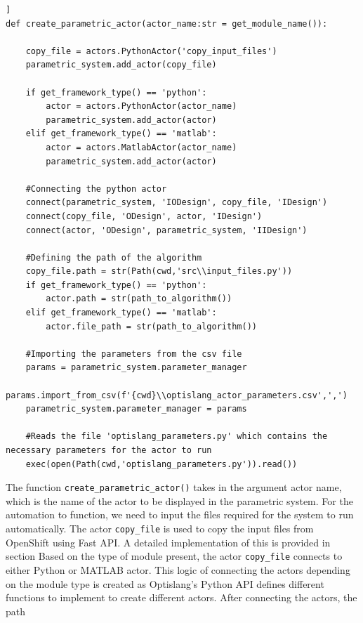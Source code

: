 \renewcommand{\lstlistingname}{Code}
\begin{lstlisting}[style=pythoncode, caption= Function to create a parametric system, label={create_parametric_system}] ]
def create_parametric_actor(actor_name:str = get_module_name()):

    copy_file = actors.PythonActor('copy_input_files')
    parametric_system.add_actor(copy_file)

    if get_framework_type() == 'python':
        actor = actors.PythonActor(actor_name)
        parametric_system.add_actor(actor)
    elif get_framework_type() == 'matlab':
        actor = actors.MatlabActor(actor_name)
        parametric_system.add_actor(actor)

    #Connecting the python actor
    connect(parametric_system, 'IODesign', copy_file, 'IDesign')
    connect(copy_file, 'ODesign', actor, 'IDesign')
    connect(actor, 'ODesign', parametric_system, 'IIDesign')

    #Defining the path of the algorithm
    copy_file.path = str(Path(cwd,'src\\input_files.py'))
    if get_framework_type() == 'python':
        actor.path = str(path_to_algorithm())
    elif get_framework_type() == 'matlab':
        actor.file_path = str(path_to_algorithm())

    #Importing the parameters from the csv file
    params = parametric_system.parameter_manager
    params.import_from_csv(f'{cwd}\\optislang_actor_parameters.csv',',')
    parametric_system.parameter_manager = params

    #Reads the file 'optislang_parameters.py' which contains the necessary parameters for the actor to run
    exec(open(Path(cwd,'optislang_parameters.py')).read())
\end{lstlisting}
The function \texttt{create\_parametric\_actor()} takes in the argument actor name, which is the name of the actor to be displayed in the parametric system.
For the automation to function, we need to input the files required for the system to run automatically. The actor \texttt{copy\_file} is used to copy the input
files from OpenShift using Fast API. A detailed implementation of this is provided in section %
Based on the type of module present, the actor \texttt{copy\_file} connects to either Python or MATLAB actor. This logic of connecting the actors depending on 
the module type is created as Optislang's Python API defines different functions to implement to create different actors. After connecting the actors, the path
